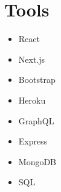 \section{Tools}

\begin{minipage}{0.40\textwidth}
\begin{itemize}
	\item React
	\item Next.js
	\item Bootstrap
	\item Heroku
\end{itemize}
\end{minipage}%
\hfill
\begin{minipage}{0.45\textwidth}
\begin{itemize}
	\item GraphQL
	\item Express
	\item MongoDB
	\item SQL
\end{itemize}
\end{minipage}%